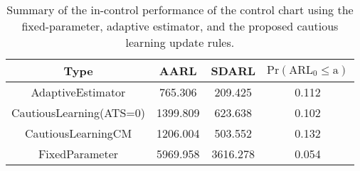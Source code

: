 \begin{table}[!h]

\caption{Summary of the in-control performance of the control chart using the fixed-parameter, adaptive estimator, and the proposed cautious learning update rules.}
\centering
\begin{tabular}[t]{cccc}
\toprule
Type & AARL & SDARL & $\text{Pr}(\text{ARL}_0 \leq \text{a})$\\
\midrule
AdaptiveEstimator & 765.306 & 209.425 & 0.112\\
CautiousLearning(ATS=0) & 1399.809 & 623.638 & 0.102\\
CautiousLearningCM & 1206.004 & 503.552 & 0.132\\
FixedParameter & 5969.958 & 3616.278 & 0.054\\
\bottomrule
\end{tabular}
\end{table}
